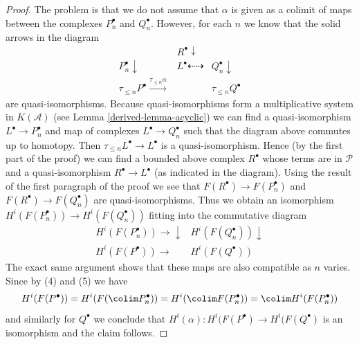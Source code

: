 \begin{proof}
\medskip\noindent
The problem is that we do not assume that $\alpha$ is given as a colimit
of maps between the complexes $P_n^\bullet$ and $Q_n^\bullet$. However,
for each $n$ we know that the solid arrows in the diagram
$$
\begin{array}{ccc} & R^\bullet \downarrow &  \\ P_n^\bullet \downarrow & L^\bullet \dashleftarrow\dashrightarrow & Q_n^\bullet \downarrow \\ \tau_{\leq n}P^\bullet \overset{\tau_{\leq n}\alpha}{\longrightarrow} &  & \tau_{\leq n}Q^\bullet\end{array}
$$
are quasi-isomorphisms. Because quasi-isomorphisms form a multiplicative
system in $K(\mathcal{A})$ (see Lemma \ref{derived-lemma-acyclic})
we can find a quasi-isomorphism
$L^\bullet \to P_n^\bullet$ and map of complexes $L^\bullet \to Q_n^\bullet$
such that the diagram above commutes up to homotopy. Then
$\tau_{\leq n}L^\bullet \to L^\bullet$ is a quasi-isomorphism.
Hence (by the first part of the proof) we can find a bounded above
complex $R^\bullet$ whose terms are in $\mathcal{P}$ and a quasi-isomorphism
$R^\bullet \to L^\bullet$ (as indicated in the diagram). Using the result
of the first paragraph of the proof we see that
$F(R^\bullet) \to F(P_n^\bullet)$ and $F(R^\bullet) \to F(Q_n^\bullet)$
are quasi-isomorphisms. Thus we obtain an isomorphism
$H^i(F(P_n^\bullet)) \to H^i(F(Q_n^\bullet))$ fitting into the commutative
diagram
$$
\begin{array}{cc}H^i(F(P_n^\bullet)) \longrightarrow\downarrow & H^i(F(Q_n^\bullet)) \downarrow \\ H^i(F(P^\bullet)) \longrightarrow & H^i(F(Q^\bullet))\end{array}
$$
The exact same argument shows that these maps are also compatible
as $n$ varies. Since by (4) and (5) we have
$$
H^i(F(P^\bullet)) =
H^i(F(\colim P_n^\bullet)) =
H^i(\colim F(P_n^\bullet)) = \colim H^i(F(P_n^\bullet))
$$
and similarly for $Q^\bullet$ we conclude that
$H^i(\alpha) : H^i(F(P^\bullet) \to H^i(F(Q^\bullet)$ is an isomorphism
and the claim follows.
\end{proof}


